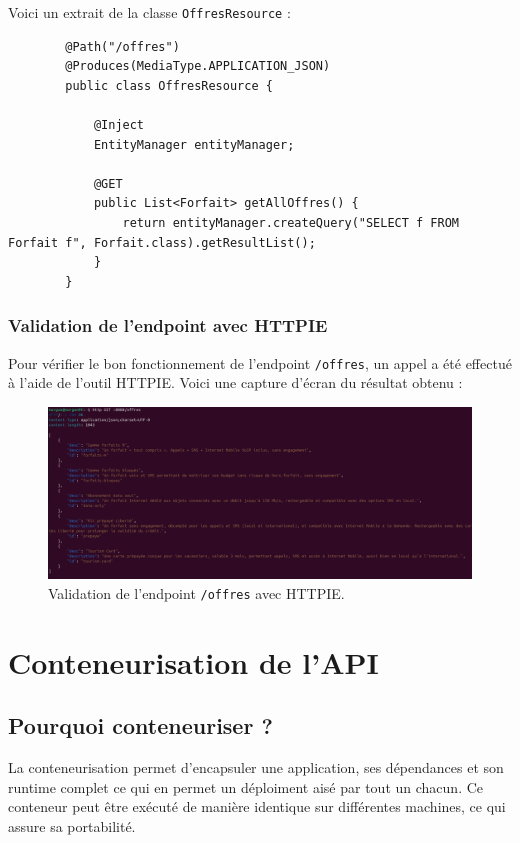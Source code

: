 \documentclass{article}
\begin{document}
	Voici un extrait de la classe \texttt{OffresResource} :
	\begin{lstlisting}
		@Path("/offres")
		@Produces(MediaType.APPLICATION_JSON)
		public class OffresResource {
			
			@Inject
			EntityManager entityManager;
			
			@GET
			public List<Forfait> getAllOffres() {
				return entityManager.createQuery("SELECT f FROM Forfait f", Forfait.class).getResultList();
			}
		}
	\end{lstlisting}
	\newpage
	\subsubsection{Validation de l'endpoint avec HTTPIE}
	
	Pour vérifier le bon fonctionnement de l'endpoint \texttt{/offres}, un appel a été effectué à l'aide de l'outil HTTPIE. Voici une capture d'écran du résultat obtenu :
	
	\begin{figure}[h!]
		\centering
		\includegraphics[width=1\textwidth]{asset/endpoint offres.png}
		\caption{Validation de l'endpoint \texttt{/offres} avec HTTPIE.}
		\label{fig:offres_endpoint}
	\end{figure}
	\section{Conteneurisation de l'API}
	
	\subsection{Pourquoi conteneuriser ?}
	
	La conteneurisation permet d'encapsuler une application, ses dépendances et son runtime complet ce qui en permet un déploiment aisé par tout un chacun. Ce conteneur peut être exécuté de manière identique sur différentes machines, ce qui assure sa portabilité.
	
\end{document}
